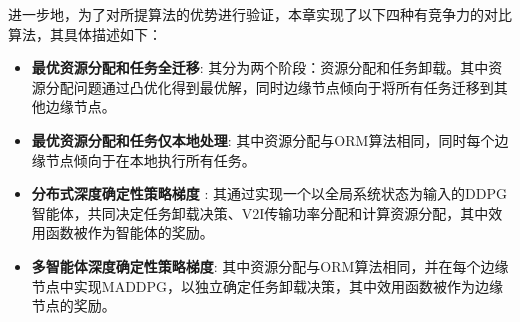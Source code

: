 \begin{table}[h]\small
{} %
\centering
{}
\label{table 3-2}
\end{table}
 
进一步地，为了对所提算法的优势进行验证，本章实现了以下四种有竞争力的对比算法，其具体描述如下：
\begin{itemize}
	\item \textbf{最优资源分配和任务全迁移}: 其分为两个阶段：资源分配和任务卸载。其中资源分配问题通过凸优化得到最优解，同时边缘节点倾向于将所有任务迁移到其他边缘节点。
	\item \textbf{最优资源分配和任务仅本地处理}: 其中资源分配与ORM算法相同，同时每个边缘节点倾向于在本地执行所有任务。
	\item \textbf{分布式深度确定性策略梯度} \cite{barth2018distributed}: 其通过实现一个以全局系统状态为输入的DDPG智能体，共同决定任务卸载决策、V2I传输功率分配和计算资源分配，其中效用函数被作为智能体的奖励。
	\item \textbf{多智能体深度确定性策略梯度}\cite{zhang2021adaptive}: 其中资源分配与ORM算法相同，并在每个边缘节点中实现MADDPG，以独立确定任务卸载决策，其中效用函数被作为边缘节点的奖励。
\end{itemize}

